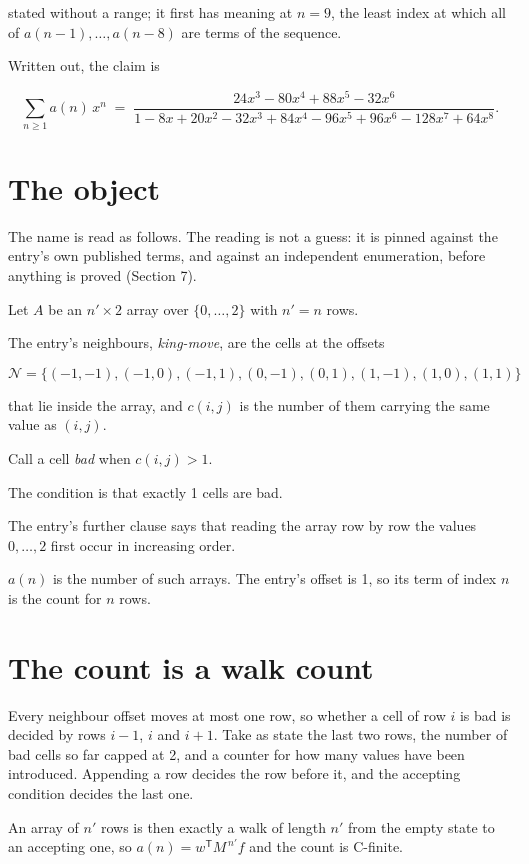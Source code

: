\documentclass[11pt]{article}
\theoremstyle{definition}
\begin{document}
stated without a range; it first has meaning at $n = 9$, the least index at which all of $a(n-1),\dots,a(n-8)$ are terms of the sequence.

Written out, the claim is

\[\sum_{n \ge 1} a(n)\,x^n \;=\; \frac{24x^{3} - 80x^{4} + 88x^{5} - 32x^{6}}{1 - 8x + 20x^{2} - 32x^{3} + 84x^{4} - 96x^{5} + 96x^{6} - 128x^{7} + 64x^{8}}.\]

\section{The object}

The name is read as follows. The reading is not a guess: it is pinned against the entry's own published terms, and against an independent enumeration, before anything is proved (Section 7).

Let $A$ be an $n' \times 2$ array over $\{0,\dots,2\}$ with $n' = n$ rows.

The entry's neighbours, {\itshape king-move}, are the cells at the offsets

\[\mathcal{N} = \{(-1,-1), (-1,0), (-1,1), (0,-1), (0,1), (1,-1), (1,0), (1,1)\}\]

that lie inside the array, and $c(i,j)$ is the number of them carrying the same value as $(i,j)$.

Call a cell {\itshape bad} when $c(i,j) > 1$.

The condition is that exactly 1 cells are bad.

The entry's further clause says that reading the array row by row the values $0,\dots,2$ first occur in increasing order.

$a(n)$ is the number of such arrays. The entry's offset is 1, so its term of index $n$ is the count for $n$ rows.

\section{The count is a walk count}

Every neighbour offset moves at most one row, so whether a cell of row $i$ is bad is decided by rows $i-1$, $i$ and $i+1$. Take as state the last two rows, the number of bad cells so far capped at 2, and a counter for how many values have been introduced. Appending a row decides the row before it, and the accepting condition decides the last one.

An array of $n'$ rows is then exactly a walk of length $n'$ from the empty state to an accepting one, so $a(n) = w^{\mathsf T}M^{\,n'}f$ and the count is C-finite.
\end{document}
